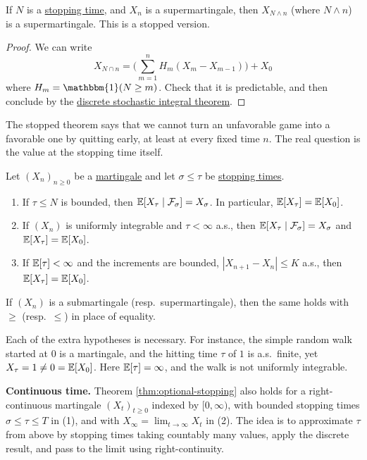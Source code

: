 	\begin{theorem}
	  \label{thm:stopped-supermartingales}
		If $N$ is a \hyperref[def:stopping-time]{stopping time}, and $X_n$ is a supermartingale, then $X_{N \wedge n}$ (where $N \wedge n$) is a supermartingale. This is a stopped version. 
	\end{theorem}
	\begin{proof}
	  We can write 
		\begin{equation}
			X_{N \cap n} = \bigg( \sum_{m=1}^n H_m (X_m - X_{m-1}) \bigg) + X_0
		\end{equation}
		where $H_m = \mathbbm{1}(N \geq m)$. Check that it is predictable, and then conclude by the \hyperref[thm:discrete-stochastic-integral-of-a]{discrete stochastic integral theorem}. 
	\end{proof}

	The stopped theorem says that we cannot turn an unfavorable game into a favorable one by quitting early, at least at every fixed time $n$. The real question is the value at the stopping time itself.  

	\begin{theorem}
	  \label{thm:optional-stopping}
		Let $(X_n)_{n \geq 0}$ be a \hyperref[def:martingale]{martingale} and let $\sigma \leq \tau$ be \hyperref[def:stopping-time]{stopping times}. 
		\begin{enumerate}
			\item If $\tau \leq N$ is bounded, then $\operatorname{\mathbb{E}}[X_\tau \mid \mathcal{F}_\sigma] = X_\sigma$. In particular, $\operatorname{\mathbb{E}}[X_\tau] = \operatorname{\mathbb{E}}[X_0]$. 
			\item If $(X_n)$ is uniformly integrable and $\tau < \infty$ a.s., then $\operatorname{\mathbb{E}}[X_\tau \mid \mathcal{F}_\sigma] = X_\sigma$ and $\operatorname{\mathbb{E}}[X_\tau] = \operatorname{\mathbb{E}}[X_0]$. 
			\item If $\operatorname{\mathbb{E}}[\tau] < \infty$ and the increments are bounded, $|X_{n+1} - X_n| \leq K$ a.s., then $\operatorname{\mathbb{E}}[X_\tau] = \operatorname{\mathbb{E}}[X_0]$. 
		\end{enumerate}
		If $(X_n)$ is a submartingale (resp.\ supermartingale), then the same holds with $\geq$ (resp.\ $\leq$) in place of equality. 
	\end{theorem}

	Each of the extra hypotheses is necessary. For instance, the simple random walk started at $0$ is a martingale, and the hitting time $\tau$ of $1$ is a.s.\ finite, yet $X_\tau = 1 \neq 0 = \operatorname{\mathbb{E}}[X_0]$. Here $\operatorname{\mathbb{E}}[\tau] = \infty$, and the walk is not uniformly integrable. 

	\textbf{Continuous time.}
		Theorem \ref{thm:optional-stopping} also holds for a right-continuous martingale $(X_t)_{t \geq 0}$ indexed by $[0, \infty)$, with bounded stopping times $\sigma \leq \tau \leq T$ in (1), and with $X_\infty = \lim_{t \to \infty} X_t$ in (2). The idea is to approximate $\tau$ from above by stopping times taking countably many values, apply the discrete result, and pass to the limit using right-continuity. 

